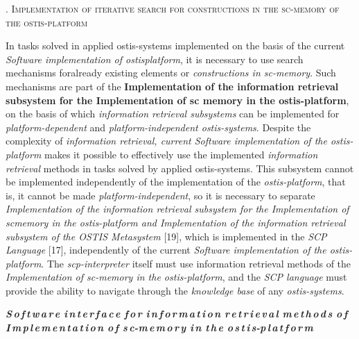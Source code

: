 \documentclass[10pt, twocolumn, a4paper]{article}
\begin{document}
 \begin{center}
   
  \vspace{8}

{ \scshape {}.  Implementation of iterative search for constructions in the sc-memory of the ostis-platform }
\end{center}
\vspace{8pt}


In tasks solved in applied ostis-systems implemented on the basis of the current \textit{Software implementation of ostisplatform}, it is necessary to use search mechanisms foralready existing elements or \textit{constructions in sc-memory}. Such mechanisms are part of the \textbf{Implementation of the information retrieval subsystem for the Implementation of sc memory in the ostis-platform}, on the basis of which \textit{information retrieval subsystems} can be implemented for \textit{platform-dependent} and \textit{platform-independent ostis-systems}. Despite the complexity of \textit{information retrieval, \emph{current} Software implementation of the ostis-platform} makes it possible to effectively use the implemented \textit{information retrieval} methods in tasks solved by applied ostis-systems. This subsystem cannot be implemented independently of the implementation of the \textit{ostis-platform}, that is, it cannot be made \textit{platform-independent}, so it is necessary to separate \textit{Implementation of the information retrieval subsystem for the Implementation of scmemory in the ostis-platform \emph{and} Implementation of the information retrieval subsystem of the OSTIS Metasystem} [19], which is implemented in the \textit{SCP Language} [17], independently of the current \textit{Software implementation of the ostis-platform}. The \textit{scp-interpreter} itself must use information retrieval methods of the \textit{Implementation of sc-memory in the ostis-platform}, and the \textit{SCP language} must provide the ability to navigate through the \textit{knowledge base} of any \textit{ostis-systems}.
\\ 
\begin{flushleft}
\textbf{\textit{S\,o\,f\,t\,w\,a\,r\,e i\,n\,t\,e\,r\,f\,a\,c\,e f\,o\,r i\,n\,f\,o\,r\,m\,a\,t\,i\,o\,n
r\,e\,t\,r\,i\,e\,v\,a\,l m\,e\,t\,h\,o\,d\,s o\,f
I\,m\,p\,l\,e\,m\,e\,n\,t\,a\,t\,i\,o\,n o\,f
s\,c-m\,e\,m\,o\,r\,y i\,n t\,h\,e o\,s\,t\,i\,s-p\,l\,a\,t\,f\,o\,r\,m\\}} \end{flushleft}
\end{document}
